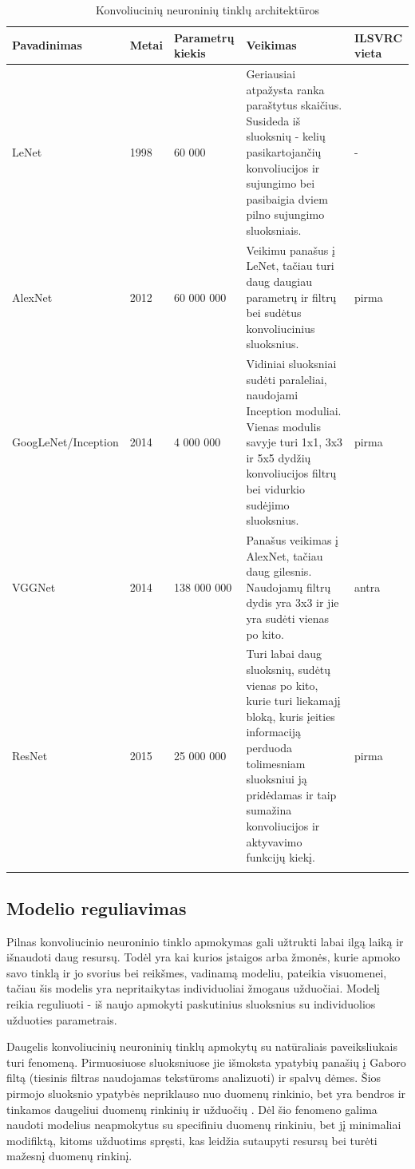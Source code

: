 \documentclass{VUMIFPSkursinis}
\begin{document}
\begin{longtable}[h!]{ | p{4cm} | p{1cm} | p{3cm} | p{5cm} | p{2cm} | } 
\hline
Pavadinimas & Metai & Parametrų kiekis & Veikimas & ILSVRC vieta \\
\hline
LeNet & 1998 & 60 000 & Geriausiai atpažysta ranka paraštytus skaičius. Susideda iš sluoksnių - kelių pasikartojančių konvoliucijos ir sujungimo bei pasibaigia dviem pilno sujungimo sluoksniais. & - \\
\hline
AlexNet & 2012 & 60 000 000 & Veikimu panašus į LeNet, tačiau turi daug daugiau parametrų ir filtrų bei sudėtus konvoliucinius sluoksnius.  & pirma \\
\hline
GoogLeNet/Inception & 2014 & 4 000 000 & Vidiniai sluoksniai sudėti paraleliai, naudojami Inception moduliai. Vienas modulis savyje turi 1x1, 3x3 ir 5x5 dydžių konvoliucijos filtrų bei vidurkio sudėjimo sluoksnius. & pirma \\
\hline
VGGNet & 2014 & 138 000 000 & Panašus veikimas į AlexNet, tačiau daug gilesnis. Naudojamų filtrų dydis yra 3x3 ir jie yra sudėti vienas po kito. & antra \\
\hline
ResNet & 2015 & 25 000 000 & Turi labai daug sluoksnių, sudėtų vienas po kito, kurie turi liekamajį bloką, kuris įeities informaciją perduoda tolimesniam sluoksniui ją pridėdamas ir taip sumažina konvoliucijos ir aktyvavimo funkcijų kiekį.  & pirma \\
\hline
\caption{Konvoliucinių neuroninių tinklų architektūros}
\end{longtable}

\subsection{Modelio reguliavimas}
Pilnas konvoliucinio neuroninio tinklo apmokymas gali užtrukti labai ilgą laiką ir išnaudoti daug resursų. Todėl yra kai kurios įstaigos arba žmonės, kurie apmoko savo 
tinklą ir jo svorius bei reikšmes, vadinamą modeliu, pateikia visuomenei, tačiau šis modelis yra nepritaikytas individuoliai žmogaus užduočiai. Modelį reikia 
reguliuoti - iš naujo apmokyti paskutinius sluoksnius su individuolios užduoties parametrais.

Daugelis konvoliucinių neuroninių tinklų apmokytų su natūraliais paveiksliukais turi fenomeną. Pirmuosiuose sluoksniuose jie išmoksta ypatybių panašių į Gaboro filtą 
(tiesinis filtras naudojamas tekstūroms analizuoti) ir spalvų dėmes. Šios pirmojo sluoksnio ypatybės nepriklauso nuo duomenų rinkinio, bet yra bendros ir tinkamos 
daugeliui duomenų rinkinių ir užduočių \cite{DBLP:journals/corr/YosinskiCBL14}. Dėl šio fenomeno galima naudoti modelius neapmokytus su specifiniu duomenų rinkiniu, 
bet jį minimaliai modifiktą, kitoms užduotims spręsti, kas leidžia sutaupyti resursų bei turėti mažesnį duomenų rinkinį.
\end{document}
